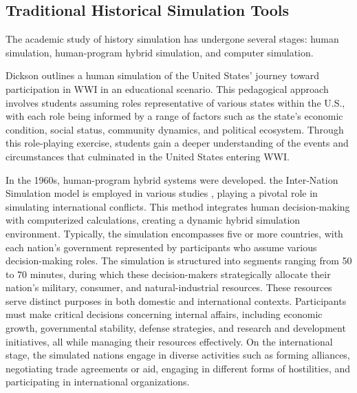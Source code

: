 \documentclass{article}
\begin{document}
\subsection{Traditional Historical Simulation Tools}
The academic study of history simulation has undergone several stages: human simulation, human-program hybrid simulation, and computer simulation. 

Dickson \cite{dickson2002road} outlines a human simulation of the United States' journey toward participation in WWI in an educational scenario. This pedagogical approach involves students assuming roles representative of various states within the U.S., with each role being informed by a range of factors such as the state's economic condition, social status, community dynamics, and political ecosystem. Through this role-playing exercise, students gain a deeper understanding of the events and circumstances that culminated in the United States entering WWI. 

In the 1960s, human-program hybrid systems were developed. the Inter-Nation Simulation model \cite{guetzkow1963simulation} is employed in various studies \cite{hermann1967attempt}, playing a pivotal role in simulating international conflicts. This method integrates human decision-making with computerized calculations, creating a dynamic hybrid simulation environment. Typically, the simulation encompasses five or more countries, with each nation's government represented by participants who assume various decision-making roles. The simulation is structured into segments ranging from 50 to 70 minutes, during which these decision-makers strategically allocate their nation's military, consumer, and natural-industrial resources. These resources serve distinct purposes in both domestic and international contexts. Participants must make critical decisions concerning internal affairs, including economic growth, governmental stability, defense strategies, and research and development initiatives, all while managing their resources effectively. On the international stage, the simulated nations engage in diverse activities such as forming alliances, negotiating trade agreements or aid, engaging in different forms of hostilities, and participating in international organizations. 
\end{document}
